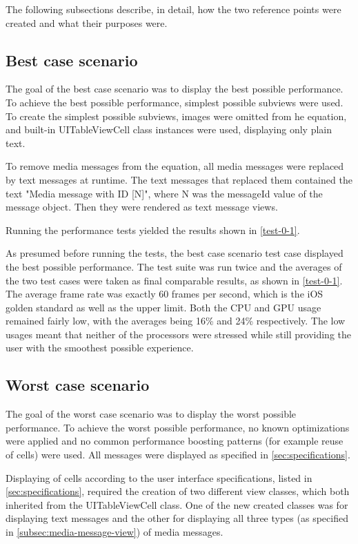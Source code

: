 \documentclass[a4paper,12pt]{article}
\begin{document}
The following subsections describe, in detail, how the two reference points were created and what their purposes were.

\subsection{Best case scenario}
\label{subsec:best-case-scenario}
The goal of the best case scenario was to display the best possible performance. To achieve the best possible performance, simplest possible subviews were used. To create the simplest possible subviews, images were omitted from he equation, and built-in UITableViewCell class instances were used, displaying only plain text.

To remove media messages from the equation, all media messages were replaced by text messages at runtime. The text messages that replaced them contained the text "Media message with ID [N]", where N was the messageId value of the message object. Then they were rendered as text message views.

Running the performance tests yielded the results shown in \autoref{test-0-1}.

As presumed before running the tests, the best case scenario test case displayed the best possible performance. The test suite was run twice and the averages of the two test cases were taken as final comparable results, as shown in \autoref{test-0-1}. The average frame rate was exactly 60 frames per second, which is the iOS golden standard\cite{IntroducingAsyncDisplayKit} as well as the upper limit\cite{WWDCFPSLimit}. Both the CPU and GPU usage remained fairly low, with the averages being 16\% and 24\% respectively. The low usages meant that neither of the processors were stressed while still providing the user with the smoothest possible experience.

\subsection{Worst case scenario}
\label{subsec:worst-case-scenario}
The goal of the worst case scenario was to display the worst possible performance. To achieve the worst possible performance, no known optimizations were applied and no common performance boosting patterns (for example reuse of cells) were used. All messages were displayed as specified in \autoref{sec:specifications}.

Displaying of cells according to the user interface specifications, listed in \autoref{sec:specifications}, required the creation of two different view classes, which both inherited from the UITableViewCell class. One of the new created classes was for displaying text messages and the other for displaying all three types (as specified in \autoref{subsec:media-message-view}) of media messages.
\end{document}
